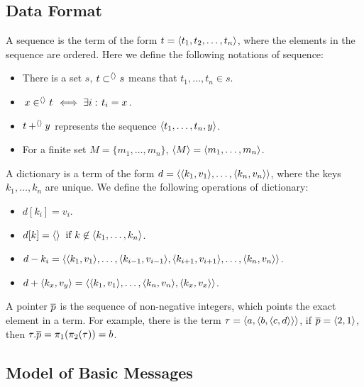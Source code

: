\subsection{Data Format}
\begin{definition}[Sequence]
A sequence is the term of the form $t=\langle t_1, t_2, \dots, t_n\rangle$, where the elements in the sequence are ordered. Here we define the following notations of sequence:
\begin{itemize}
\item There is a set $s$, $t \subset^{\langle\rangle} s$ means that $t_1,\dots,t_n \in s$. 
\item $\left. x \in^{\langle\rangle} t\right. \iff \exists
  i: \left. t_i = x\right.$.
\item $t +^{\langle\rangle} y$ represents the sequence
  $\langle t_1,\dots,t_n,y\rangle$.  
\item For a finite set $M = \{m_1, \dots,m_n\}$,
  $\langle M\rangle = \langle m_1,\dots,m_n\rangle$. 
\end{itemize}
\end{definition}

\begin{definition}[Dictionary]
A dictionary is a term of the form $d = \langle\langle k_1, v_1\rangle, \dots, \langle k_n, v_n\rangle\rangle$, where the keys $k_1, \dots, k_n$ are unique. We define the following operations of dictionary:
\begin{itemize}
\item $d[k_i]=v_i$.
\item $d[k]=\langle\rangle \text{\;\;if\ } k \not\in \langle k_1, \dots, k_n\rangle$.
\item $d-k_i = \langle\langle k_1, v_1\rangle, \dots, \langle k_{i-1}, v_{i-1}\rangle, \langle k_{i+1}, v_{i+1}\rangle, \dots, \langle k_n, v_n\rangle\rangle$.
\item $d+\langle k_x, v_y\rangle = \langle\langle k_1, v_1\rangle, \dots, \langle k_n, v_n\rangle, \langle k_x, v_x\rangle\rangle$.
\end{itemize}
\end{definition}


\begin{definition}[Pointer]
A pointer $\overline{p}$ is the sequence of non-negative integers, which points the exact element in a term. For example, there is the term $\tau=\langle a, \langle b, \langle c, d\rangle\rangle\rangle$, if $\overline{p}=\langle2,1\rangle$, then $\tau.\overline{p} = \pi_1(\pi_2(\tau)) = b$.
\end{definition}


\subsection{Model of Basic Messages}

